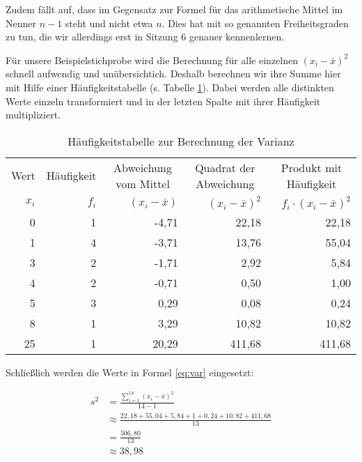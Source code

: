 \documentclass[
  ngerman,
]{article}
\begin{document}
Zudem fällt auf, dass im Gegensatz zur Formel für das arithmetische Mittel im Nenner \(n-1\) steht und nicht etwa \(n\). Dies hat mit so genannten Freiheitsgraden zu tun, die wir allerdings erst in Sitzung 6 genauer kennenlernen.

Für unsere Beispielstichprobe wird die Berechnung für alle einzelnen \((x_i-\bar{x})^2\) schnell aufwendig und unübersichtich. Deshalb berechnen wir ihre Summe hier mit Hilfe einer Häufigkeitstabelle (s. Tabelle \ref{tab:freq}). Dabei werden alle distinkten Werte einzeln transformiert und in der letzten Spalte mit ihrer Häufigkeit multipliziert.

\begin{table}

\caption{\label{tab:freq}Häufigkeitstabelle zur Berechnung der Varianz}
\centering
\begin{tabular}[t]{rrrrr}
\toprule
\multicolumn{1}{c}{Wert} & \multicolumn{1}{c}{Häufigkeit} & \multicolumn{1}{c}{Abweichung vom Mittel} & \multicolumn{1}{c}{Quadrat der Abweichung} & \multicolumn{1}{c}{Produkt mit Häufigkeit} \\
\cmidrule(l{3pt}r{3pt}){1-1} \cmidrule(l{3pt}r{3pt}){2-2} \cmidrule(l{3pt}r{3pt}){3-3} \cmidrule(l{3pt}r{3pt}){4-4} \cmidrule(l{3pt}r{3pt}){5-5}
$x_i$ & $f_i$ & $(x_i- \bar{x})$ & $(x_i- \bar{x})^2$ & $f_i\cdot(x_i -\bar{x})^2$\\
\midrule
0 & 1 & -4,71 & 22,18 & 22,18\\
1 & 4 & -3,71 & 13,76 & 55,04\\
3 & 2 & -1,71 & 2,92 & 5,84\\
4 & 2 & -0,71 & 0,50 & 1,00\\
5 & 3 & 0,29 & 0,08 & 0,24\\
8 & 1 & 3,29 & 10,82 & 10,82\\
25 & 1 & 20,29 & 411,68 & 411,68\\
\bottomrule
\end{tabular}
\end{table}

Schließlich werden die Werte in Formel \ref{eq:var} eingesetzt:

\nopagebreak

\[\begin{aligned}
    s^2&=\frac{\sum\limits_{i=1}^{14}(x_{i}-\bar{x})^2}{14-1} \\[4pt]
       &\approx\frac{22,18+55,04+5,84+1+0,24+10,82+411,68}{13} \\[4pt]
       &=\frac{506,80}{13}\\[4pt]
       &\approx 38,98
\end{aligned}\]
\end{document}

